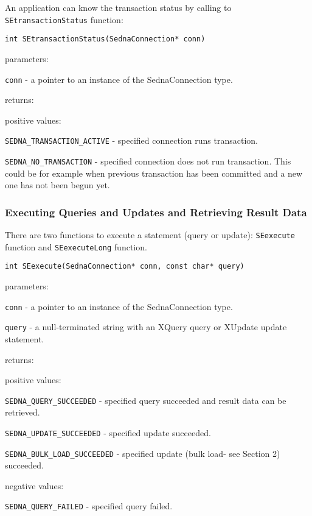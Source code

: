 \documentclass[a4paper,12pt]{article}
\begin{document}
An application can know the transaction status by calling to \verb!SEtransactionStatus! function:

\begin{verbatim}int SEtransactionStatus(SednaConnection* conn)\end{verbatim}

parameters:

\verb!conn! - a pointer to an instance of the SednaConnection type.

returns:

positive values:

\verb!SEDNA_TRANSACTION_ACTIVE! - specified connection runs transaction.

\verb!SEDNA_NO_TRANSACTION! - specified connection does not run transaction. This could be for example when previous transaction has been committed and a new one has not been begun yet.

\verb!!


\subsubsection{Executing Queries and Updates and Retrieving Result Data}
\label{exec-capi}

There are two functions to execute a statement (query or update): \verb!SEexecute! function and \verb!SEexecuteLong! function.

\begin{verbatim}int SEexecute(SednaConnection* conn, const char* query)\end{verbatim}

parameters:

\verb!conn! - a pointer to an instance of the SednaConnection type.

\verb!query! - a null-terminated string with an XQuery query or XUpdate update statement.

returns:

positive values:

\verb!SEDNA_QUERY_SUCCEEDED! - specified query succeeded and result data can be retrieved.

\verb!SEDNA_UPDATE_SUCCEEDED! - specified update succeeded.

\verb!SEDNA_BULK_LOAD_SUCCEEDED! - specified update (bulk load- see Section 2) succeeded.


negative values:

\verb!SEDNA_QUERY_FAILED! - specified query failed.
\end{document}
